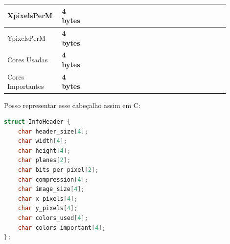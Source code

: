 \documentclass[a4paper,oneside,12pt]{article}
\begin{document}
\begin{center}
\begin{tabular}{|p{0.2\linewidth}|p{0.1\linewidth}|p{0.6\linewidth}|}
    \hline
    XpixelsPerM & \textbf{4 bytes} & \\
    \hline
    YpixelsPerM & \textbf{4 bytes} & \\
    \hline
    Cores Usadas & \textbf{4 bytes} & \\
    \hline
    Cores Importantes & \textbf{4 bytes} & \\
    \hline
\end{tabular}
\end{center}

Posso representar esse cabeçalho assim em C:
\begin{lstlisting}[language=C, caption=Cabeçalho de Informação em C]
struct InfoHeader {
    char header_size[4];
    char width[4];
    char height[4];
    char planes[2];
    char bits_per_pixel[2];
    char compression[4];
    char image_size[4];
    char x_pixels[4];
    char y_pixels[4];
    char colors_used[4];
    char colors_important[4];
};
\end{lstlisting}
\end{document}
